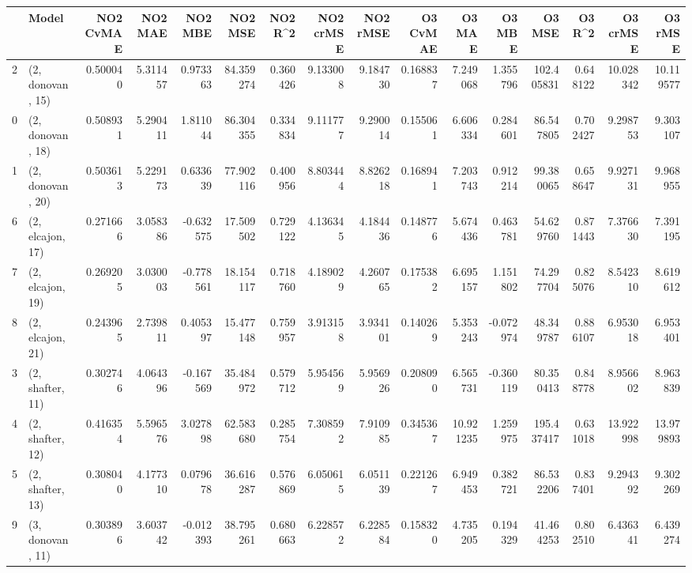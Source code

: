 \begin{tabular}{llrrrrrrrrrrrrrr}
\toprule
{} &             Model &  NO2 CvMAE &   NO2 MAE &   NO2 MBE &    NO2 MSE &   NO2 R\textasciicircum2 &  NO2 crMSE &  NO2 rMSE &  O3 CvMAE &     O3 MAE &    O3 MBE &      O3 MSE &    O3 R\textasciicircum2 &   O3 crMSE &    O3 rMSE \\
\midrule
2  &  (2, donovan, 15) &   0.500040 &  5.311457 &  0.973363 &  84.359274 &  0.360426 &   9.133008 &  9.184730 &  0.168837 &   7.249068 &  1.355796 &  102.405831 &  0.648122 &  10.028342 &  10.119577 \\
0  &  (2, donovan, 18) &   0.508931 &  5.290411 &  1.811044 &  86.304355 &  0.334834 &   9.111777 &  9.290014 &  0.155061 &   6.606334 &  0.284601 &   86.547805 &  0.702427 &   9.298753 &   9.303107 \\
1  &  (2, donovan, 20) &   0.503613 &  5.229173 &  0.633639 &  77.902116 &  0.400956 &   8.803444 &  8.826218 &  0.168941 &   7.203743 &  0.912214 &   99.380065 &  0.658647 &   9.927131 &   9.968955 \\
6  &  (2, elcajon, 17) &   0.271666 &  3.058386 & -0.632575 &  17.509502 &  0.729122 &   4.136345 &  4.184436 &  0.148776 &   5.674436 &  0.463781 &   54.629760 &  0.871443 &   7.376630 &   7.391195 \\
7  &  (2, elcajon, 19) &   0.269205 &  3.030003 & -0.778561 &  18.154117 &  0.718760 &   4.189029 &  4.260765 &  0.175382 &   6.695157 &  1.151802 &   74.297704 &  0.825076 &   8.542310 &   8.619612 \\
8  &  (2, elcajon, 21) &   0.243965 &  2.739811 &  0.405397 &  15.477148 &  0.759957 &   3.913158 &  3.934101 &  0.140269 &   5.353243 & -0.072974 &   48.349787 &  0.886107 &   6.953018 &   6.953401 \\
3  &  (2, shafter, 11) &   0.302746 &  4.064396 & -0.167569 &  35.484972 &  0.579712 &   5.954569 &  5.956926 &  0.208090 &   6.565731 & -0.360119 &   80.350413 &  0.848778 &   8.956602 &   8.963839 \\
4  &  (2, shafter, 12) &   0.416354 &  5.596576 &  3.027898 &  62.583680 &  0.285754 &   7.308592 &  7.910985 &  0.345367 &  10.921235 &  1.259975 &  195.437417 &  0.631018 &  13.922998 &  13.979893 \\
5  &  (2, shafter, 13) &   0.308040 &  4.177310 &  0.079678 &  36.616287 &  0.576869 &   6.050615 &  6.051139 &  0.221267 &   6.949453 &  0.382721 &   86.532206 &  0.837401 &   9.294392 &   9.302269 \\
9  &  (3, donovan, 11) &   0.303896 &  3.603742 & -0.012393 &  38.795261 &  0.680663 &   6.228572 &  6.228584 &  0.158320 &   4.735205 &  0.194329 &   41.464253 &  0.802510 &   6.436341 &   6.439274 \\

\end{tabular}
